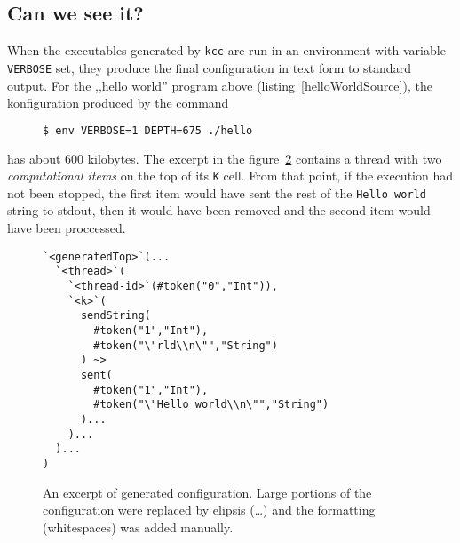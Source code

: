 \documentclass{fithesis3}
\newcommand{\kcc}{\texttt{kcc} } %
\begin{document}
\subsection{Can we see it?}

When the executables generated by \kcc are run in an environment with variable \texttt{VERBOSE} set, they produce the final configuration in text form to standard output. For the ,,hello world'' program above (listing~\ref{helloWorldSource}), the konfiguration produced by
the command
\begin{figure}[h]
\begin{lstlisting}[language=bash]
$ env VERBOSE=1 DEPTH=675 ./hello
\end{lstlisting}
\label{exampleConfigurationCommand}
\end{figure}

has about 600 kilobytes. The excerpt in the figure~\ref{exampleConfigurationOutput} contains a thread with two \textit{computational items} on the top of its \texttt{K} cell. From that point, if the execution had not been stopped, the first item would have sent the rest of the \texttt{Hello world} string to stdout, then it would have been removed and the second item would have been proccessed.

\begin{figure}[h]
\begin{lstlisting}
`<generatedTop>`(...
  `<thread>`(
    `<thread-id>`(#token("0","Int")),
    `<k>`(
      sendString(
        #token("1","Int"),
        #token("\"rld\\n\"","String")
      ) ~>
      sent(
        #token("1","Int"),
        #token("\"Hello world\\n\"","String")
      )...
    )...
  )...
)
\end{lstlisting}
\caption{An excerpt of 
generated configuration.
Large portions of the configuration were replaced by elipsis (\ldots) and the formatting (whitespaces) was added manually.}
\label{exampleConfigurationOutput}
\end{figure}



\end{document}
